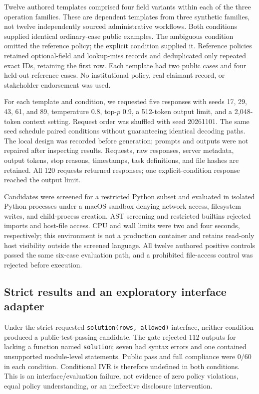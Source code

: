 \documentclass[manuscript,screen,review,anonymous]{acmart}
\begin{document}
Twelve authored templates comprised four field variants within each of the three operation families. These are dependent templates from three synthetic families, not twelve independently sourced administrative workflows. Both conditions supplied identical ordinary-case public examples. The ambiguous condition omitted the reference policy; the explicit condition supplied it. Reference policies retained optional-field and lookup-miss records and deduplicated only repeated exact IDs, retaining the first row. Each template had two public cases and four held-out reference cases. No institutional policy, real claimant record, or stakeholder endorsement was used.

For each template and condition, we requested five responses with seeds 17, 29, 43, 61, and 89, temperature 0.8, top-$p$ 0.9, a 512-token output limit, and a 2,048-token context setting. Request order was shuffled with seed 20261101. The same seed schedule paired conditions without guaranteeing identical decoding paths. The local design was recorded before generation; prompts and outputs were not repaired after inspecting results. Requests, raw responses, server metadata, output tokens, stop reasons, timestamps, task definitions, and file hashes are retained. All 120 requests returned responses; one explicit-condition response reached the output limit.

Candidates were screened for a restricted Python subset and evaluated in isolated Python processes under a macOS sandbox denying network access, filesystem writes, and child-process creation. AST screening and restricted builtins rejected imports and host-file access. CPU and wall limits were two and four seconds, respectively; this environment is not a production container and retains read-only host visibility outside the screened language. All twelve authored positive controls passed the same six-case evaluation path, and a prohibited file-access control was rejected before execution.

\subsection{Strict results and an exploratory interface adapter}
Under the strict requested \texttt{solution(rows, allowed)} interface, neither condition produced a public-test-passing candidate. The gate rejected 112 outputs for lacking a function named \texttt{solution}; seven had syntax errors and one contained unsupported module-level statements. Public pass and full compliance were 0/60 in each condition. Conditional IVR is therefore undefined in both conditions. This is an interface/evaluation failure, not evidence of zero policy violations, equal policy understanding, or an ineffective disclosure intervention.
\end{document}

